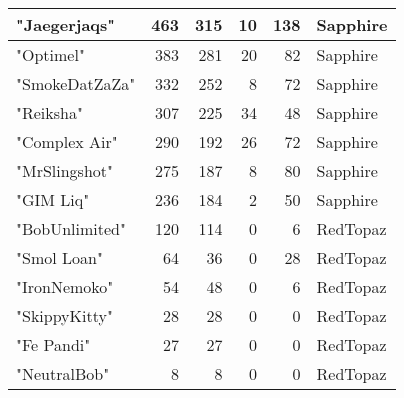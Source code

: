\documentclass{article}
\begin{document}
\begin{table}[htbp]
\begin{tabular}{|l|r|r|r|r|l|}
"Jaegerjaqs" & 463 & 315 & 10 & 138 & Sapphire \\ \hline
"Optimel" & 383 & 281 & 20 & 82 & Sapphire \\ \hline
"SmokeDatZaZa" & 332 & 252 & 8 & 72 & Sapphire \\ \hline
"Reiksha" & 307 & 225 & 34 & 48 & Sapphire \\ \hline
"Complex Air" & 290 & 192 & 26 & 72 & Sapphire \\ \hline
"MrSlingshot" & 275 & 187 & 8 & 80 & Sapphire \\ \hline
"GIM Liq" & 236 & 184 & 2 & 50 & Sapphire \\ \hline
"BobUnlimited" & 120 & 114 & 0 & 6 & RedTopaz \\ \hline
"Smol Loan" & 64 & 36 & 0 & 28 & RedTopaz \\ \hline
"IronNemoko" & 54 & 48 & 0 & 6 & RedTopaz \\ \hline
"SkippyKitty" & 28 & 28 & 0 & 0 & RedTopaz \\ \hline
"Fe Pandi" & 27 & 27 & 0 & 0 & RedTopaz \\ \hline
"NeutralBob" & 8 & 8 & 0 & 0 & RedTopaz \\ \hline
\end{tabular}
\end{table}
\end{document}
